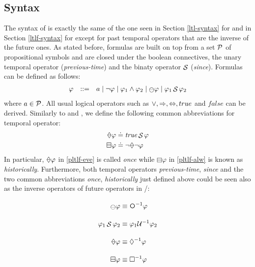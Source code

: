 \subsection{Syntax}
The syntax of \PLTL is exactly the same of the one seen in Section \ref{ltl-syntax} for \LTL and in Section \ref{ltlf-syntax} for \LTLf except for past temporal operators that are the inverse of the future ones. As stated before, \PLTL formulas are built on top from a set $\P$ of propositional symbols and are closed under the boolean connectives, the unary temporal operator \Yesterday (\emph{previous-time}) and the binaty operator $\Since$ (\emph{since}). Formulas can be defined as follows:
\[\begin{array}{rcl}
\varphi &::=& a \mid \lnot \varphi \mid \varphi_1\land \varphi_2 \mid \Yesterday\varphi \mid \varphi_1 \Since \varphi_2
\end{array}
\]
where $a\in \P$. All usual logical operators such as $\lOR, \Rightarrow, \Leftrightarrow, true$ and $false$ can be derived.
Similarly to \LTL and \LTLf, we define the following common abbreviations for temporal operator:
\begin{align}
\Once\varphi &\doteq \true\Since\varphi \label{pltlf-eve}\\
\boxminus\varphi &\doteq\lnot\Once\lnot\varphi \label{pltlf-alw}\
\end{align}
In particular, $\Once\varphi$ in \ref{pltlf-eve} is called \emph{once} while $\boxminus\varphi$ in \ref{pltlf-alw} is known as \emph{historically}. Furthermore, both temporal operators \emph{previous-time}, \emph{since} and the two common abbreviations \emph{once}, \emph{historically} just defined above could be seen also as the inverse operators of  future operators in \LTL/\LTLf:
\begin{align}
\Yesterday\varphi &\equiv \Next^{-1}\varphi \nonumber\\
\varphi_1\Since\varphi_2 &\equiv \varphi_1\mathcal{U}^{-1}\varphi_2 \nonumber\\
\Once\varphi &\equiv \Diamond^{-1}\varphi \nonumber\\
\boxminus\varphi &\equiv \Box^{-1}\varphi \nonumber\
\end{align}
